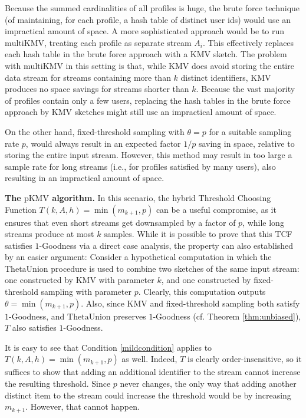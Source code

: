 \documentclass{article}
\newcommand{\pIKMV}{\mathrm{pKMV}}
\newcommand{\romIKMV}{\mathrm{multiKMV}}
\newcommand{\thetaunion}{\mathrm{ThetaUnion}}
\begin{document}
Because the summed cardinalities of all profiles is huge, the brute
force technique (of maintaining, for each profile, a hash table of distinct user ids) would use an impractical amount of space.  
A more sophisticated approach would be to run $\romIKMV$,
treating each profile as separate stream $A_i$. This effectively replaces each hash table in the brute force approach with a KMV sketch.
The problem with $\romIKMV$ in this setting is that, while KMV does avoid storing the entire data stream for streams containing more than $k$ distinct identifiers, KMV
produces no space savings for streams shorter than $k$. 
Because the vast majority of profiles contain only a few users, replacing the hash tables in the brute force approach by KMV
sketches might still use an impractical amount of space.


On the other hand, fixed-threshold sampling with $\theta = p$ for a suitable sampling rate $p$, would
always result in an expected factor $1/p$ saving in space, relative to storing the entire input stream. 
However, this method may result in too large a sample rate for long streams (i.e., for profiles satisfied by many users), also resulting in an impractical amount of space.


\noindent \textbf{The $\pIKMV$ algorithm.} In this scenario, the hybrid Threshold Choosing Function $T(k, A, h) =                                                                      
\min (m_{k+1}, p)$ can be a useful compromise, as it ensures that even short streams get downsampled by a factor of $p$,
while long streams produce at most $k$ samples. 
While it is possible to
prove that this TCF satisfies $1$-Goodness via a direct case analysis, the property
can also established by an easier argument: Consider a hypothetical
computation in which the $\thetaunion$ procedure is used to combine two
sketches of the same input stream: one constructed by KMV with
parameter $k$, and one constructed by fixed-threshold sampling with
parameter $p$.  Clearly, this computation outputs $\theta = \min                                                                           
(m_{k+1}, p)$. Also, since KMV and fixed-threshold sampling both
satisfy $1$-Goodness, and $\thetaunion$ preserves $1$-Goodness (cf. Theorem \ref{thm:unbiased}), $T$ also satisfies $1$-Goodness.

It is easy to see that Condition \ref{mildcondition} applies to $T(k, A, h) = \min (m_{k+1}, p)$ as well. Indeed,
$T$ is clearly order-insensitive, so it suffices to show that adding an additional identifier to the stream cannot
increase the resulting threshold. Since $p$ never changes,
the only way that adding another distinct item to the stream could increase the threshold would be
by increasing $m_{k+1}$. However, that cannot happen.
\end{document}
